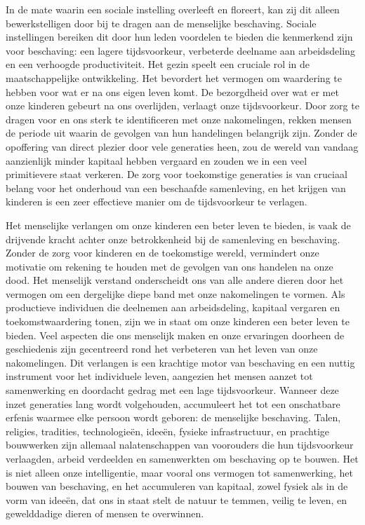 In de mate waarin een sociale instelling overleeft en floreert, kan zij dit alleen bewerkstelligen door bij te dragen aan de menselijke beschaving. Sociale instellingen bereiken dit door hun leden voordelen te bieden die kenmerkend zijn voor beschaving: een lagere tijdsvoorkeur, verbeterde deelname aan arbeidsdeling en een verhoogde productiviteit. Het gezin speelt een cruciale rol in de maatschappelijke ontwikkeling. Het bevordert het vermogen om waardering te hebben voor wat er na ons eigen leven komt. De bezorgdheid over wat er met onze kinderen gebeurt na ons overlijden, verlaagt onze tijdsvoorkeur. Door zorg te dragen voor en ons sterk te identificeren met onze nakomelingen, rekken mensen de periode uit waarin de gevolgen van hun handelingen belangrijk zijn. Zonder de opoffering van direct plezier door vele generaties heen, zou de wereld van vandaag aanzienlijk minder kapitaal hebben vergaard en zouden we in een veel primitievere staat verkeren. De zorg voor toekomstige generaties is van cruciaal belang voor het onderhoud van een beschaafde samenleving, en het krijgen van kinderen is een zeer effectieve manier om de tijdsvoorkeur te verlagen.

Het menselijke verlangen om onze kinderen een beter leven te bieden, is vaak de drijvende kracht achter onze betrokkenheid bij de samenleving en beschaving. Zonder de zorg voor kinderen en de toekomstige wereld, vermindert onze motivatie om rekening te houden met de gevolgen van ons handelen na onze dood. Het menselijk verstand onderscheidt ons van alle andere dieren door het vermogen om een dergelijke diepe band met onze nakomelingen te vormen. Als productieve individuen die deelnemen aan arbeidsdeling, kapitaal vergaren en toekomstwaardering tonen, zijn we in staat om onze kinderen een beter leven te bieden. Veel aspecten die ons menselijk maken en onze ervaringen doorheen de geschiedenis zijn gecentreerd rond het verbeteren van het leven van onze nakomelingen. Dit verlangen is een krachtige motor van beschaving en een nuttig instrument voor het individuele leven, aangezien het mensen aanzet tot samenwerking en doordacht gedrag met een lage tijdsvoorkeur. Wanneer deze inzet generaties lang wordt volgehouden, accumuleert het tot een onschatbare erfenis waarmee elke persoon wordt geboren: de menselijke beschaving. Talen, religies, tradities, technologieën, ideeën, fysieke infrastructuur, en prachtige bouwwerken zijn allemaal nalatenschappen van voorouders die hun tijdsvoorkeur verlaagden, arbeid verdeelden en samenwerkten om beschaving op te bouwen. Het is niet alleen onze intelligentie, maar vooral ons vermogen tot samenwerking, het bouwen van beschaving, en het accumuleren van kapitaal, zowel fysiek als in de vorm van ideeën, dat ons in staat stelt de natuur te temmen, veilig te leven, en gewelddadige dieren of mensen te overwinnen.

